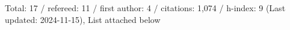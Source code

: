 Total: 17 / refereed: 11 / first author: 4 / citations: 1,074 / h-index: 9 (Last updated: 2024-11-15), List attached below